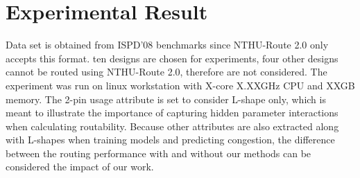 \section{Experimental Result}
Data set is obtained from ISPD'08 benchmarks since NTHU-Route 2.0 only accepts this format. ten designs are chosen for experiments, four other designs cannot be routed using NTHU-Route 2.0, therefore are not considered. The experiment was run on linux workstation with X-core X.XXGHz CPU and XXGB memory. The 2-pin usage attribute is set to consider L-shape only, which is meant to illustrate the importance of capturing hidden parameter interactions when calculating routability. Because other attributes are also extracted along with L-shapes when training models and predicting congestion, the difference between the routing performance with and without our methods can be considered the impact of our work.

